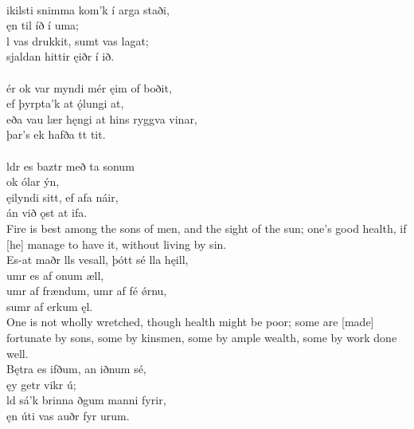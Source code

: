  \\

\bva {}ikilsti snimma \hld kom'k í arga staði, \\%
\ind ęn til íð í uma; \\%
l vas drukkit, \hld sumt vas lagat; \\%
\ind sjaldan hittir ęiðr í ið.\\%

 \\

\bva {}ér ok var \hld myndi mér ęim of boðit, \\%
\ind ef þyrpta'k at ǫ́lungi at, \\%
eða vau lær hęngi \hld at hins ryggva vinar, \\%
\ind þar's ek hafða tt tit.\\%

 \\

\bva {}ldr es baztr \hld með ta sonum \\%
\ind ok ólar ýn, \\%
ęilyndi sitt, \hld ef afa náir, \\%
\ind án við ǫst at ifa.\\%

\bvb Fire is best among the sons of men, and the sight of the sun; one's good health, if [he] manage to have it, without living by sin. \\

\bva Es-at maðr lls vesall, \hld þótt sé lla hęill, \\%
\ind {}umr es af onum æll, \\%
umr af frændum, \hld {}umr af fé ǿrnu, \\%
\ind sumr af erkum ęl.\\%

\bvb One is not wholly wretched, though health might be poor; some are [made] fortunate by sons, some by kinsmen, some by ample wealth, some by work done well. \\

\bva Bętra es ifðum, \hld an iðnum sé, \\%
\ind ęy getr vikr ú; \\%
ld sá'k brinna \hld {}ðgum manni fyrir, \\%
\ind ęn úti vas auðr fyr urum.\\%

